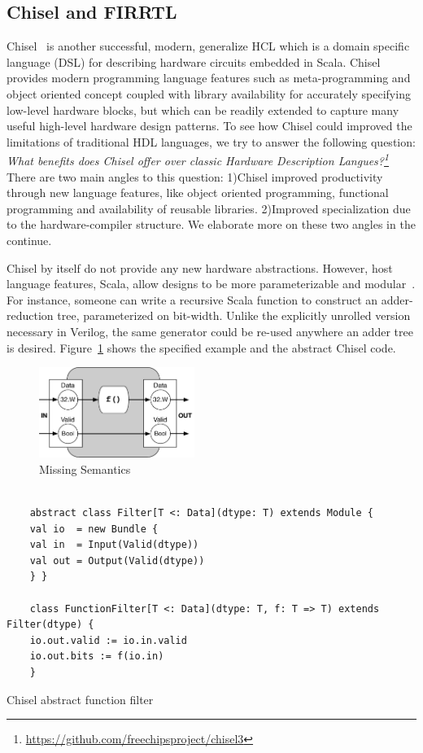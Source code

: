 \subsection{Chisel and FIRRTL}

Chisel~\cite{chisel} is another successful, modern, generalize HCL which is a domain specific language (DSL) for describing hardware circuits embedded in Scala.
Chisel provides modern programming language features such as meta-programming and object oriented concept coupled with library availability for accurately specifying low-level hardware blocks, but which can be readily extended to capture many useful high-level hardware design patterns.
To see how Chisel could improved the limitations of traditional HDL languages, we try to answer the following question:
\emph{What benefits does Chisel offer over classic Hardware Description Langues?\footnote{\url{https://github.com/freechipsproject/chisel3}}}
There are two main angles to this question: 1)Chisel improved productivity through new language features, like object oriented programming, functional programming and availability of reusable libraries. 2)Improved specialization due to the hardware-compiler structure. We elaborate more on these two angles in the continue.

Chisel by itself do not provide any new hardware abstractions. However, host language features, Scala, allow designs to be more parameterizable and modular~\cite{izraelevitz_2017_firrtl_reusability}.
For instance,  someone can write a recursive Scala function to construct an adder-reduction tree, parameterized on bit-width.
Unlike the explicitly unrolled version necessary in Verilog, the same generator could be re-used anywhere an adder tree is desired.
Figure~\ref{fig:filter} shows the specified example and the abstract Chisel code.

\begin{figure}[h]
    \centering
    \includegraphics[width=0.45\textwidth]{figures/Introduction/Filter.pdf}
    \caption{Missing Semantics}
    \label{fig:filter}
\end{figure}


\begin{listing}[ht]
    \begin{verbatim}

    abstract class Filter[T <: Data](dtype: T) extends Module {
    val io  = new Bundle {
    val in  = Input(Valid(dtype))
    val out = Output(Valid(dtype))
    } }

    class FunctionFilter[T <: Data](dtype: T, f: T => T) extends Filter(dtype) {
    io.out.valid := io.in.valid
    io.out.bits := f(io.in)
    }

    \end{verbatim}
    \caption{Chisel abstract function filter}
    \label{listing:chisel_example}
\end{listing}


